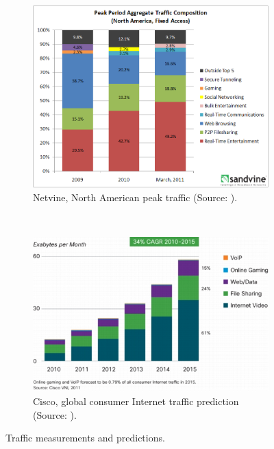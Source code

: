 \begin{figure}
	\centering
    	\begin{subfigure}[b]{0.50\textwidth}
                \centering
                \includegraphics[width=\textwidth]{images/expose/netvine.png}
                \caption{Netvine, North American peak traffic (Source: \cite{sandvine_spring2011}).}
                \label{fig:netvine}
        \end{subfigure}%
        ~
    	\begin{subfigure}[b]{0.50\textwidth}
                \centering
                \includegraphics[width=\textwidth]{images/expose/ciscoVNI.jpg}
                \caption{Cisco, global consumer Internet traffic prediction (Source: \cite{cisco2011VNI}).}
                \label{fig:cisco}
        \end{subfigure}
	\caption{Traffic measurements and predictions.}
	\label{fig:traffic}
\end{figure}


